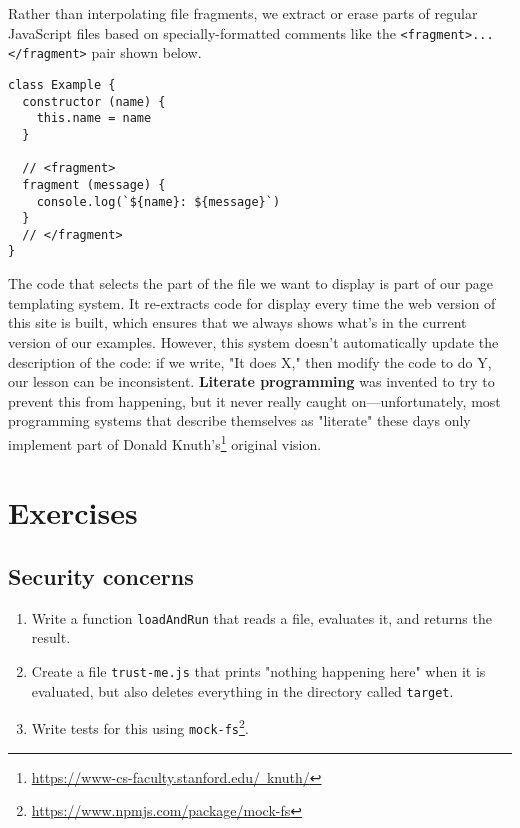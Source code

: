 \documentclass[krantzl]{krantz}
\newcommand{\glossref}[1]{\textbf{#1}}
\newcommand{\hreffoot}[2]{{#1}\footnote{\href{#2}{#2}}}
\begin{document}
Rather than interpolating file fragments,
we extract or erase parts of regular JavaScript files
based on specially-formatted comments
like the \texttt{<fragment>...</fragment>} pair shown below.

\begin{lstlisting}[frame=single,frameround=tttt]
class Example {
  constructor (name) {
    this.name = name
  }

  // <fragment>
  fragment (message) {
    console.log(`${name}: ${message}`)
  }
  // </fragment>
}
\end{lstlisting}


The code that selects the part of the file we want to display
is part of our page templating system.
It re-extracts code for display every time the web version of this site is built,
which ensures that we always shows what's in the current version of our examples.
However,
this system doesn't automatically update the description of the code:
if we write, "It does X,"
then modify the code to do Y,
our lesson can be inconsistent.
\glossref{Literate programming} was invented
to try to prevent this from happening,
but it never really caught on---unfortunately,
most programming systems that describe themselves as "literate" these days
only implement part of \hreffoot{Donald Knuth's}{https://www-cs-faculty.stanford.edu/~knuth/} original vision.


\section{Exercises}\label{file-interpolator-exercises}

\subsection*{Security concerns}

\begin{enumerate}

\item 

Write a function \texttt{loadAndRun} that reads a file, evaluates it, and returns the result.



\item 

Create a file \texttt{trust-me.js} that prints "nothing happening here" when it is evaluated,
    but also deletes everything in the directory called \texttt{target}.



\item 

Write tests for this using \hreffoot{\texttt{mock-fs}}{https://www.npmjs.com/package/mock-fs}.



\end{enumerate}
\end{document}
